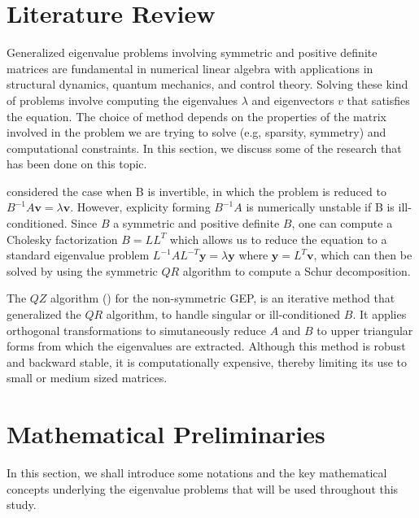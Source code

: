 \section{Literature Review}\label{sec:LiteratureReview}
Generalized eigenvalue problems involving symmetric and positive definite matrices are fundamental in numerical linear algebra with applications in structural  dynamics, quantum mechanics, and control theory. Solving these kind of problems involve computing the eigenvalues $\lambda$ and eigenvectors $v$ that satisfies the equation. The choice of method depends on the properties of the matrix involved in the problem we are trying to solve (e.g, sparsity, symmetry) and computational constraints. In this section, we discuss some of the research that has been done on this topic.

\cite{doi:10.1137/1.9781421407944} considered the case when B is invertible, in which the problem is reduced to $B^{-1}A\mathbf{v} = \lambda \mathbf{v}$. However, explicity forming $B^{-1}A$ is numerically unstable if B is ill-conditioned. Since $B$ a symmetric and positive definite $B$, one can compute a Cholesky factorization $B = LL^{T}$ which allows us to  reduce the equation to a standard eigenvalue problem $L^{-1}AL^{-T}\mathbf{y} = \lambda \mathbf{y}$ where $\mathbf{y}= L^T \mathbf{v}$, which can then be solved by using the symmetric $QR$ algorithm to compute a Schur decomposition.

The $QZ$ algorithm (\cite{5b3d5fb1-4813-3046-9331-a730b392f611}) for the non-symmetric GEP, is an iterative method that generalized the $QR$ algorithm, to handle singular or ill-conditioned $B$. It applies orthogonal transformations to simutaneously reduce $A$ and $B$ to upper triangular forms from which the eigenvalues are extracted. Although this method is robust and backward stable, it is computationally expensive, thereby limiting its use to small or medium sized matrices.

\section{Mathematical Preliminaries}\label{sec:MathPrelim}
In this section, we shall introduce some notations and the key mathematical concepts underlying the eigenvalue problems that will be used throughout this study.
